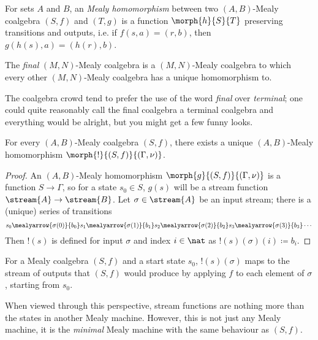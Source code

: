 \begin{definition}\label{def:mealy-homomorphism}
    For sets \(A\) and \(B\), an \emph{Mealy homomorphism} between two
    \((A,B)\)-Mealy coalgebra \((S,f)\) and \((T,g)\) is a function
    \(\morph{h}{S}{T}\) preserving transitions and
    outputs, i.e. if \(f(s,a) = (r,b)\), then \(g(h(s),a) = (h(r),b)\).
\end{definition}

The \emph{final} \((M,N)\)-Mealy coalgebra is a \((M,N)\)-Mealy coalgebra to
which every other \((M,N)\)-Mealy coalgebra has a unique homomorphism to.

\begin{remark}
    The coalgebra crowd tend to prefer the use of the word \emph{final} over
    \emph{terminal}; one could quite reasonably call the final coalgebra a
    terminal coalgebra and everything would be alright, but you might get a few
    funny looks.
\end{remark}

\begin{proposition}
    \label{prop:final-coalgebra}
    For every \((A,B)\)-Mealy coalgebra \((S,f)\), there exists a
    unique \((A,B)\)-Mealy homomorphism \(\morph{{!}}{(S,f)}{(\Gamma,\nu)}\).
\end{proposition}
\begin{proof}
    An \((A,B)\)-Mealy homomorphism \(\morph{g}{(S, f)}{(\Gamma, \nu)}\) is a
    function \(S \to \Gamma\), so for a state \(s_0 \in S\), \(g(s)\) will be a
    stream function \(\stream{A} \to \stream{B}\).
    Let \(\sigma \in \stream{A}\) be an input stream; there is a (unique) series
    of transitions \[
        s_0
        \mealyarrow{\sigma(0)}{b_0}
        s_1
        \mealyarrow{\sigma(1)}{b_1}
        s_2
        \mealyarrow{\sigma(2)}{b_2}
        s_3
        \mealyarrow{\sigma(3)}{b_3}
        \cdots
    \]
    Then \(!(s)\) is defined for input \(\sigma\) and
    index \(i \in \nat\) as \(!(s)(\sigma)(i) \coloneqq b_i\).
\end{proof}

For a Mealy coalgebra \((S, f)\) and a start state \(s_0\),
\(!(s)(\sigma)\) maps to the stream of outputs that \((S, f)\) would produce
by applying \(f\) to each element of \(\sigma\), starting from \(s_0\).

When viewed through this perspective, stream functions are nothing more than the
states in another Mealy machine.
However, this is not just any Mealy machine, it is the \emph{minimal} Mealy
machine with the same behaviour as \((S, f)\).

